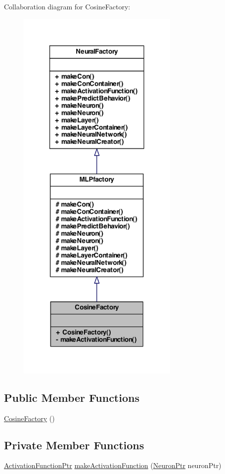 Collaboration diagram for CosineFactory:
\nopagebreak
\begin{figure}[H]
\begin{center}
\leavevmode
\includegraphics[width=222pt]{class_cosine_factory__coll__graph}
\end{center}
\end{figure}
\subsection*{Public Member Functions}
\begin{DoxyCompactItemize}
\item 
\hyperlink{class_cosine_factory_ab0e1416246babfea24ededf7ee0dafc9}{CosineFactory} ()
\end{DoxyCompactItemize}
\subsection*{Private Member Functions}
\begin{DoxyCompactItemize}
\item 
\hyperlink{_a_m_o_r_e_8h_a77602a0277a02e5769c3df0adc669b17}{ActivationFunctionPtr} \hyperlink{class_cosine_factory_a7db770cbd419032850a7e4f09b0836cc}{makeActivationFunction} (\hyperlink{_a_m_o_r_e_8h_ac1ea936c2c7728eb382278131652fef4}{NeuronPtr} neuronPtr)
\end{DoxyCompactItemize}


